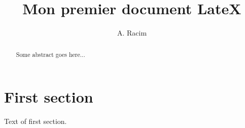 \documentclass[a4paper,10pt]{article}
\title{Mon premier document LateX}
\author{A. Racim}
\begin{document}
\maketitle

\begin{abstract}
Some abstract goes here...
\end{abstract}

\section{First section}

Text of first section.




%
\end{document}
